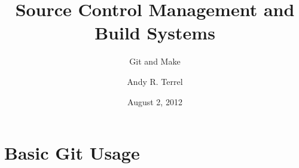 \documentclass{beamer}
\title{Source Control Management and Build Systems}
\subtitle{Git and Make}
\author{Andy R. Terrel}
\institute{The Texas Advanced Computing Center}
\date{August 2, 2012}  %
\begin{document}
\begin{frame}
  \titlepage
\end{frame}




\section{Basic Git Usage}




\end{document}
